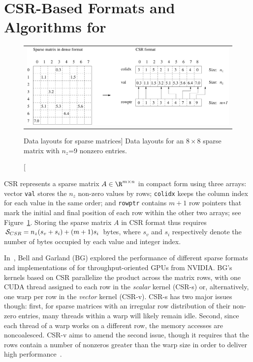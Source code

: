 \section{CSR-Based Formats and Algorithms for \spmv}
\label{2017-csr-spmv:sec:spmv}

\begin{figure}[t]
\begin{tabular}{c}
\begin{minipage}{\textwidth}
\begin{center}
\includegraphics[width=\textwidth]{plots/csr_format}
\end{center}
\end{minipage}
\end{tabular}
\caption
[Data layouts for sparse matrices]
{Data layouts
for an $8 \times 8$ sparse matrix with $n_z$=9 nonzero entries.}
\label{2017-csr-spmv:fig:spmv}
\end{figure}


CSR represents a sparse matrix $A \in \R^{m \times n}$ in compact form
using three arrays:
vector {\tt val} stores the $n_z$ non-zero values by rows;
{\tt colidx} keeps the column index for each value in the same order;
and {\tt rowptr} contains $m+1$ row pointers that mark the initial
and final position of each row within the other two arrays;
see Figure~\ref{2017-csr-spmv:fig:spmv}.
Storing the sparse matrix $A$ in CSR format thus requires ${\cal S}_{CSR} = n_z(s_v+s_i)+(m+1)s_i$ bytes, where
$s_v$ and $s_i$ respectively denote the number of bytes occupied 
by each value and integer index.

In~\cite{Bell:SpMV:NVIDIA:2008}, Bell and Garland (BG) explored the performance
of different sparse formats and implementations of \spmv for throughput-oriented GPUs from NVIDIA.
BG's \spmv kernels based on CSR
parallelize the product
across the matrix rows,
with one CUDA thread assigned to each row in the {\em scalar} kernel (CSR-s) or,
alternatively, one warp per row in the {\em vector} kernel (CSR-v).
CSR-s has two major issues though: first, for sparse matrices with an
irregular row distribution of their non-zero entries,
many threads within a warp will likely remain idle.
Second, since each thread of a warp works on a different row,
the memory accesses are noncoalesced.
CSR-v aims to amend the second issue,
though it
requires that the rows contain a number of nonzeros greater than the warp
size in order to deliver high performance~\cite{Bell:SpMV:NVIDIA:2008}.

